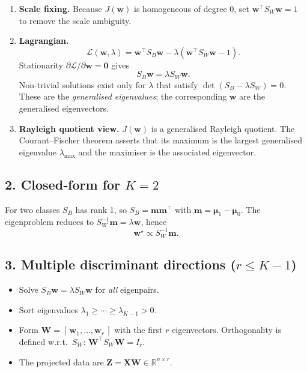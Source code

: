 \begin{enumerate}
\item \textbf{Scale fixing.}\; Because $J(\mathbf w)$ is homogeneous of degree 0, set 
      $\mathbf w^{\top}S_W\mathbf w=1$ to remove the scale ambiguity.

\item \textbf{Lagrangian.}\; 
      \[
      \mathcal L(\mathbf w,\lambda)=\mathbf w^{\top}S_B\mathbf w-\lambda(\mathbf w^{\top}S_W\mathbf w-1).
      \]
      Stationarity $\partial\mathcal L/\partial\mathbf w=\mathbf 0$ gives
      \[
      S_B\mathbf w=\lambda S_W\mathbf w.
      \]
      Non‑trivial solutions exist only for $\lambda$ that satisfy 
      $\det(S_B-\lambda S_W)=0$.  These are the \emph{generalised eigenvalues};
      the corresponding $\mathbf w$ are the generalised eigenvectors.

\item \textbf{Rayleigh quotient view.}\; $J(\mathbf w)$ is a generalised Rayleigh 
      quotient.  The Courant–Fischer theorem asserts that its maximum is the largest
      generalised eigenvalue $\lambda_{\max}$ and the maximiser is the associated
      eigenvector.
\end{enumerate}

\subsection*{2.\; Closed‑form for $K=2$}

For two classes $S_B$ has rank 1, so $S_B=\mathbf m\mathbf m^{\top}$ with
$\mathbf m=\boldsymbol\mu_1-\boldsymbol\mu_0$.  
The eigenproblem reduces to $S_W^{-1}\mathbf m=\lambda \mathbf w$, hence
\[
\boxed{\;\mathbf w^\star \propto S_W^{-1}\mathbf m.\;}
\]

\subsection*{3.\; Multiple discriminant directions ($r\le K-1$)}

\begin{itemize}
\item Solve $S_B\mathbf w=\lambda S_W\mathbf w$ for \emph{all} eigenpairs.
\item Sort eigenvalues $\lambda_1\ge\cdots\ge\lambda_{K-1}>0$.
\item Form $\mathbf W=[\,\mathbf w_1,\dots,\mathbf w_r\,]$ with the first $r$ eigenvectors.
      Orthogonality is defined w.r.t.\ $S_W$: 
      $\mathbf W^\top S_W \mathbf W = I_r$.
\item The projected data are $\mathbf Z=\mathbf X\mathbf W\in\mathbb R^{n\times r}$.
\end{itemize}

